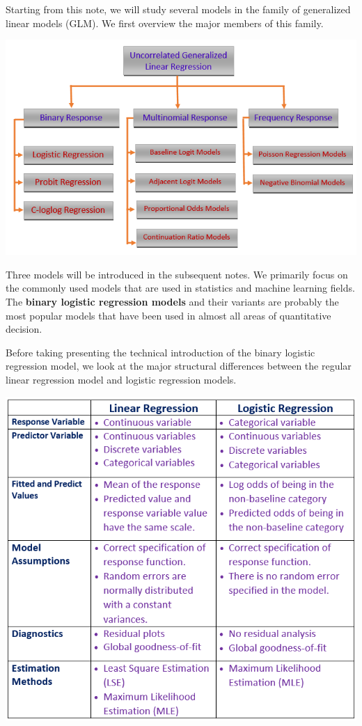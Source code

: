 \documentclass[
]{book}
\begin{document}
\hfill\break

Starting from this note, we will study several models in the family of generalized linear models (GLM). We first overview the major members of this family.

\hfill\break

\begin{center}\includegraphics[width=0.95\linewidth]{img06/w06-GLMClassification} \end{center}

\hfill\break

Three models will be introduced in the subsequent notes. We primarily focus on the commonly used models that are used in statistics and machine learning fields. The \textbf{binary logistic regression models} and their variants are probably the most popular models that have been used in almost all areas of quantitative decision.

Before taking presenting the technical introduction of the binary logistic regression model, we look at the major structural differences between the regular linear regression model and logistic regression models.

\begin{center}\includegraphics[width=0.8\linewidth]{img06/w06-LMvsGLM} \end{center}
\end{document}
